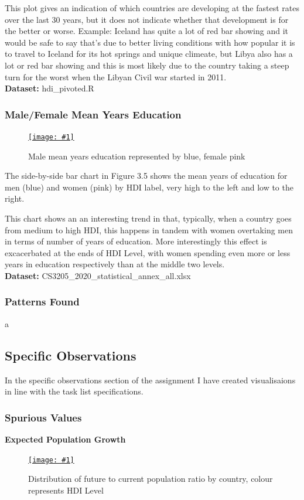 \documentclass[11pt,a4paper,final]{article}
\newcommand\onlinefig[3]{
\begin{figure}[H]
  \centering
  \href{#3}{\texttt{[image: \#1]}}
  \caption{#2} 
  \label{fig:#1}
\end{figure}
}
\begin{document}
\begin{multicols}{2}
This plot gives an indication of which countries are developing at the fastest rates over the last 30 years, but it does not indicate whether that development is for the better or worse. Example: Iceland has quite a lot of red bar showing and it would be safe to say that's due to better living conditions with how popular it is to travel to Iceland for its hot springs and unique climeate, but Libya also has a lot or red bar showing and this is most likely due to the country taking a steep turn for the worst when the Libyan Civil war started in 2011.
\\
\textbf{Dataset:} hdi\_pivoted.R

\subsubsection{Male/Female Mean Years Education}
\onlinefig{men_vs_women_mean_years_education_barchart}{Male mean years education represented by blue, female pink}{https://public.tableau.com/views/CS3205-HDI/Sheet2?:language=en-GB&:display_count=n&:origin=viz_share_link}

The side-by-side bar chart in Figure 3.5 shows the mean years of education for men (blue) and women (pink) by HDI label, very high to the left and low to the right.

This chart shows an an interesting trend in that, typically, when a country goes from medium to high HDI, this happens in tandem with women overtaking men in terms of number of years of education. More interestingly this effect is excacerbated at the ends of HDI Level, with women spending even more or less years in education respectively than at the middle two levels.
\\
\textbf{Dataset:} CS3205\_2020\_statistical\_annex\_all.xlsx

\subsubsection{Patterns Found}
a


\subsection{Specific Observations}
In the specific observations section of the assignment I have created visualisaions in line with the task list specifications.

\subsubsection{Spurious Values}
\textbf{Expected Population Growth}
\onlinefig{population_growth_ratio_boxplot}{Distribution of future to current population ratio by country, colour represents HDI Level}{https://public.tableau.com/views/CS3205-HDI/Sheet11?:language=en-GB&:display_count=n&:origin=viz_share_link}


\end{multicols}
\end{document}
